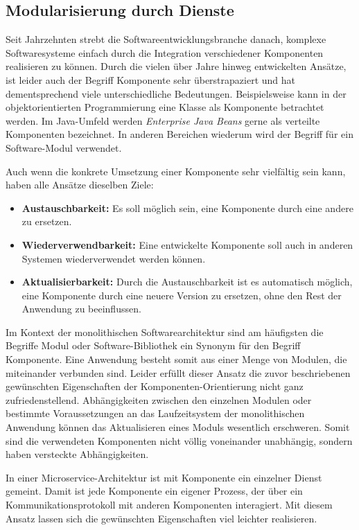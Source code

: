 \subsection{Modularisierung durch Dienste}
\label{subsec:Componentization}

Seit Jahrzehnten strebt die Softwareentwicklungsbranche danach, komplexe Softwaresysteme einfach durch die Integration verschiedener Komponenten realisieren zu können. Durch die vielen über Jahre hinweg entwickelten Ansätze, ist leider auch der Begriff Komponente sehr überstrapaziert und hat dementsprechend viele unterschiedliche Bedeutungen. Beispielsweise kann in der objektorientierten Programmierung eine Klasse als Komponente betrachtet werden. Im Java-Umfeld werden \textit{Enterprise Java Beans} gerne als verteilte Komponenten bezeichnet. In anderen Bereichen wiederum wird der Begriff für ein Software-Modul verwendet.

Auch wenn die konkrete Umsetzung einer Komponente sehr vielfältig sein kann, haben alle Ansätze dieselben Ziele:

\begin{itemize}
	\item \textbf{Austauschbarkeit:} Es soll möglich sein, eine Komponente durch eine andere zu ersetzen. 
	\item \textbf{Wiederverwendbarkeit:} Eine entwickelte Komponente soll auch in anderen Systemen wiederverwendet werden können.
	\item \textbf{Aktualisierbarkeit:} Durch die Austauschbarkeit ist es automatisch möglich, eine Komponente durch eine neuere Version zu ersetzen, ohne den Rest der Anwendung zu beeinflussen.
\end{itemize}

Im Kontext der monolithischen Softwarearchitektur sind am häufigsten die Begriffe Modul oder Software-Bibliothek ein Synonym für den Begriff Komponente. Eine Anwendung besteht somit aus einer Menge von Modulen, die miteinander verbunden sind. Leider erfüllt dieser Ansatz die zuvor beschriebenen gewünschten Eigenschaften der Komponenten-Orientierung nicht ganz zufriedenstellend. Abhängigkeiten zwischen den einzelnen Modulen oder bestimmte Voraussetzungen an das Laufzeitsystem der monolithischen Anwendung können das Aktualisieren eines Moduls wesentlich erschweren. Somit sind die verwendeten Komponenten nicht völlig voneinander unabhängig, sondern haben versteckte Abhängigkeiten.

In einer Microservice-Architektur ist mit Komponente ein einzelner Dienst gemeint. Damit ist jede Komponente ein eigener Prozess, der über ein Kommunikationsprotokoll mit anderen Komponenten interagiert. Mit diesem Ansatz lassen sich die gewünschten Eigenschaften viel leichter realisieren.

